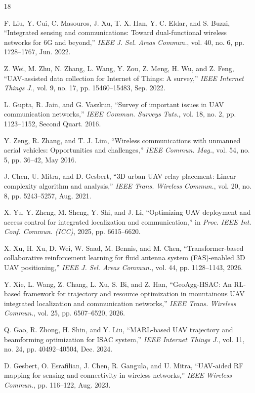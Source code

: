 \documentclass[10pt,journal,letterpaper]{IEEEtran}
\begin{document}
\begin{thebibliography}{18}

F. Liu, Y. Cui, C. Masouros, J. Xu, T. X. Han, Y. C. Eldar, and S. Buzzi, ``Integrated sensing and communications: Toward dual-functional wireless networks for 6G and beyond,'' \emph{IEEE J. Sel. Areas Commun.}, vol. 40, no. 6, pp. 1728--1767, Jun. 2022.

Z. Wei, M. Zhu, N. Zhang, L. Wang, Y. Zou, Z. Meng, H. Wu, and Z. Feng, ``UAV-assisted data collection for Internet of Things: A survey,'' \emph{IEEE Internet Things J.}, vol. 9, no. 17, pp. 15460--15483, Sep. 2022.

L. Gupta, R. Jain, and G. Vaszkun, ``Survey of important issues in UAV communication networks,'' \emph{IEEE Commun. Surveys Tuts.}, vol. 18, no. 2, pp. 1123--1152, Second Quart. 2016.

Y. Zeng, R. Zhang, and T. J. Lim, ``Wireless communications with unmanned aerial vehicles: Opportunities and challenges,'' \emph{IEEE Commun. Mag.}, vol. 54, no. 5, pp. 36--42, May 2016.

J. Chen, U. Mitra, and D. Gesbert, ``3D urban UAV relay placement: Linear complexity algorithm and analysis,'' \emph{IEEE Trans. Wireless Commun.}, vol. 20, no. 8, pp. 5243--5257, Aug. 2021.

X. Yu, Y. Zheng, M. Sheng, Y. Shi, and J. Li, ``Optimizing UAV deployment and access control for integrated localization and communication,'' in \emph{Proc. IEEE Int. Conf. Commun. (ICC)}, 2025, pp. 6615--6620.

X. Xu, H. Xu, D. Wei, W. Saad, M. Bennis, and M. Chen, ``Transformer-based collaborative reinforcement learning for fluid antenna system (FAS)-enabled 3D UAV positioning,'' \emph{IEEE J. Sel. Areas Commun.}, vol. 44, pp. 1128--1143, 2026.

Y. Xie, L. Wang, Z. Chang, L. Xu, S. Bi, and Z. Han, ``GeoAgg-HSAC: An RL-based framework for trajectory and resource optimization in mountainous UAV integrated localization and communication networks,'' \emph{IEEE Trans. Wireless Commun.}, vol. 25, pp. 6507--6520, 2026.

Q. Gao, R. Zhong, H. Shin, and Y. Liu, ``MARL-based UAV trajectory and beamforming optimization for ISAC system,'' \emph{IEEE Internet Things J.}, vol. 11, no. 24, pp. 40492--40504, Dec. 2024.

D. Gesbert, O. Esrafilian, J. Chen, R. Gangula, and U. Mitra, ``UAV-aided RF mapping for sensing and connectivity in wireless networks,'' \emph{IEEE Wireless Commun.}, pp. 116--122, Aug. 2023.


\end{thebibliography}
\end{document}

